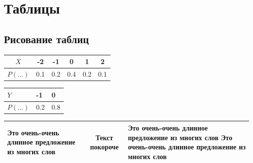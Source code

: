 \documentclass[12pt, a4paper]{article}
\begin{document}
\section{Таблицы}

\subsection{Рисование таблиц}

\begin{tabular}{|c|c|c|c|c|c|}
\hline
$X$ & -2 & -1 & 0 & 1 & 2 \\
\hline
$P(\ldots)$ & 0.1 & 0.2 & 0.4 & 0.2 & 0.1 \\
\hline
\end{tabular}




\vspace{20mm}

% 
% 
%



\begin{tabular}{|m{3cm}|p{1cm}|p{3cm}|}
\hline
$Y$ & -1 & 0 \\
\hline
$P(\ldots)$ & 0.2 & 0.8 \\
\hline
\end{tabular}

\vspace{20mm}


\begin{tabularx}{\textwidth}{|X|c|X|}
	\hline
	Это очень-очень длинное предложение из многих слов & Текст покороче & Это очень-очень длинное предложение из многих слов Это очень-очень длинное предложение из многих слов \\
	\hline
\end{tabularx}
\end{document}
